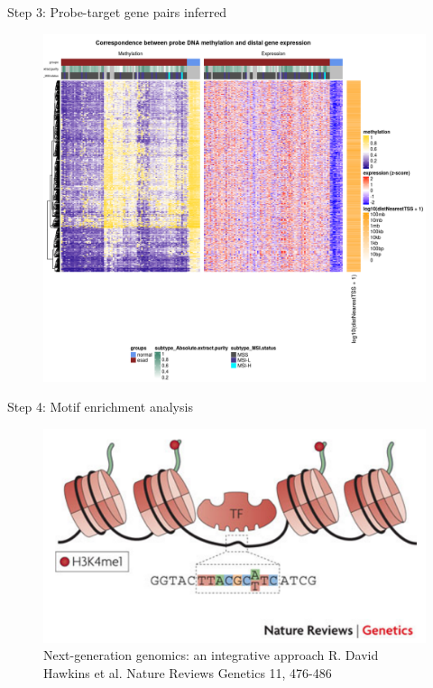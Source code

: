 \documentclass[slidestop,compress,11pt,xcolor=dvipsnames]{beamer}
\begin{document}
\begin{frame}{Step 3: Probe-target gene pairs inferred}
 \vspace*{-0.3cm}
 \begin{figure}
  \centering
  \includegraphics[width=0.75\linewidth]{ELMER/heatmappair.png}
 \end{figure}
\end{frame}


\begin{frame}{Step 4: Motif enrichment analysis}

 \vspace*{-0.3cm}
 \begin{figure}
  \centering
  \includegraphics[width=1.0\linewidth]{ELMER/tf_binding.png}{\tiny{\\Next-generation genomics: an integrative approach R. David Hawkins et al. Nature Reviews Genetics 11, 476-486}}
 \end{figure}
\end{frame}
\end{document}
